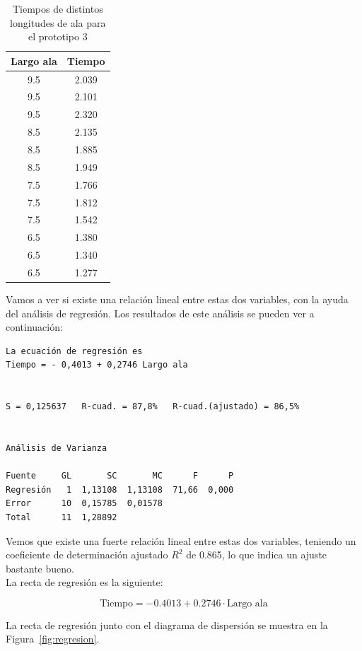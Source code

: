 \documentclass[12pt,a4paper,twoside,openright,titlepage,final]{article}
\begin{document}
\begin{table}[htbp!]
	\centering
	\caption{Tiempos de distintos longitudes de ala para el prototipo 3}
	\label{tbl:regresion}
	\begin{tabular}{@{}cc@{}}
		\toprule
		Largo ala & Tiempo \\ \midrule
		9.5       & 2.039  \\
		9.5       & 2.101  \\
		9.5       & 2.320  \\
		8.5       & 2.135  \\
		8.5       & 1.885  \\
		8.5       & 1.949  \\
		7.5       & 1.766  \\
		7.5       & 1.812  \\
		7.5       & 1.542  \\
		6.5       & 1.380  \\
		6.5       & 1.340  \\
		6.5       & 1.277  \\ \bottomrule
	\end{tabular}
\end{table}

Vamos a ver si existe una relación lineal entre estas dos variables, con la ayuda del análisis de regresión. Los resultados de este análisis se pueden ver a continuación:

\begin{verbatim}
La ecuación de regresión es
Tiempo = - 0,4013 + 0,2746 Largo ala


S = 0,125637   R-cuad. = 87,8%   R-cuad.(ajustado) = 86,5%


Análisis de Varianza

Fuente     GL       SC       MC      F      P
Regresión   1  1,13108  1,13108  71,66  0,000
Error      10  0,15785  0,01578
Total      11  1,28892
\end{verbatim}

Vemos que existe una fuerte relación lineal entre estas dos variables, teniendo un coeficiente de determinación ajustado $R^2$ de 0.865, lo que indica un ajuste bastante bueno.\\

La recta de regresión es la siguiente:

\begin{equation*}
\text{Tiempo} = -0.4013 + 0.2746 \cdot \text{Largo ala}
\end{equation*}

La recta de regresión junto con el diagrama de dispersión se muestra en la Figura~\ref{fig:regresion}.\\
\end{document}
